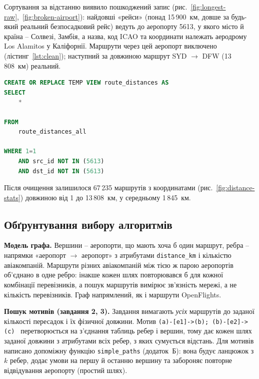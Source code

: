 \documentclass{iasa-lab}
\begin{document}
Сортування за відстанню виявило пошкоджений запис (рис.~\ref{fig:longest-raw},~\ref{fig:broken-airport}): найдовші «рейси» (понад 15\,900~км, довше за будь-який реальний безпосадковий рейс) ведуть до аеропорту 5613, у якого місто й країна -- Солвезі, Замбія, а назва, код ICAO та координати належать аеродрому Los Alamitos у Каліфорнії. Маршрути через цей аеропорт виключено (лістинг~\ref{lst:clean}); наступний за довжиною маршрут SYD $\to$ DFW (13\,808~км) реальний.



\noindent\begin{minipage}{\linewidth}
\begin{lstlisting}[language=SQL, caption={Виключення маршрутів через пошкоджений аеропорт}, label={lst:clean}]
CREATE OR REPLACE TEMP VIEW route_distances AS
SELECT
    *

FROM
    route_distances_all

WHERE 1=1
    AND src_id NOT IN (5613)
    AND dst_id NOT IN (5613)
\end{lstlisting}
\end{minipage}
\medskip

Після очищення залишилося 67\,235 маршрутів з координатами (рис.~\ref{fig:distance-stats}) довжиною від 1 до 13\,808~км, у середньому 1\,845~км.


\subsection{Обґрунтування вибору алгоритмів}

\textbf{Модель графа.} Вершини -- аеропорти, що мають хоча б один маршрут, ребра -- напрямки «аеропорт $\to$ аеропорт» з атрибутами \texttt{distance\_km} і кількістю авіакомпаній. Маршрути різних авіакомпаній між тією ж парою аеропортів об'єднано в одне ребро: інакше кожен шлях повторювався б для кожної комбінації перевізників, а пошук маршрутів вимірює зв'язність мережі, а не кількість перевізників. Граф напрямлений, як і маршрути OpenFlights.

\textbf{Пошук мотивів (завдання 2, 3).} Завдання вимагають \emph{усіх} маршрутів до заданої кількості пересадок і їх фізичної довжини. Мотив \texttt{(a)-[e1]->(b); (b)-[e2]->(c)}~\cite{graphframes-docs} перетворюється на з'єднання таблиць ребер і вершин, тому дає кожен шлях заданої довжини з атрибутами всіх ребер, з яких сумується відстань. Для мотивів написано допоміжну функцію \texttt{simple\_paths} (додаток~Б): вона будує ланцюжок з $k$ ребер, додає умови на першу й останню вершину та забороняє повторне відвідування аеропорту (простий шлях).
\end{document}
